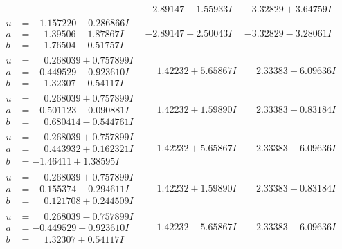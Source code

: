 \documentclass[1p]{elsarticle_modified}
\theoremstyle{definition}
\begin{document}
$$\begin{array}{c|c|c}
 & -2.89147 - 1.55933 I & -3.32829 + 3.64759 I \\ \hline\begin{aligned}
u &= -1.157220 - 0.286866 I \\
a &= \phantom{-}1.39506 - 1.87867 I \\
b &= \phantom{-}1.76504 - 0.51757 I\end{aligned}
 & -2.89147 + 2.50043 I & -3.32829 - 3.28061 I \\ \hline\begin{aligned}
u &= \phantom{-}0.268039 + 0.757899 I \\
a &= -0.449529 - 0.923610 I \\
b &= \phantom{-}1.32307 - 0.54117 I\end{aligned}
 & \phantom{-}1.42232 + 5.65867 I & \phantom{-}2.33383 - 6.09636 I \\ \hline\begin{aligned}
u &= \phantom{-}0.268039 + 0.757899 I \\
a &= -0.501123 + 0.090881 I \\
b &= \phantom{-}0.680414 - 0.544761 I\end{aligned}
 & \phantom{-}1.42232 + 1.59890 I & \phantom{-}2.33383 + 0.83184 I \\ \hline\begin{aligned}
u &= \phantom{-}0.268039 + 0.757899 I \\
a &= \phantom{-}0.443932 + 0.162321 I \\
b &= -1.46411 + 1.38595 I\end{aligned}
 & \phantom{-}1.42232 + 5.65867 I & \phantom{-}2.33383 - 6.09636 I \\ \hline\begin{aligned}
u &= \phantom{-}0.268039 + 0.757899 I \\
a &= -0.155374 + 0.294611 I \\
b &= \phantom{-}0.121708 + 0.244509 I\end{aligned}
 & \phantom{-}1.42232 + 1.59890 I & \phantom{-}2.33383 + 0.83184 I \\ \hline\begin{aligned}
u &= \phantom{-}0.268039 - 0.757899 I \\
a &= -0.449529 + 0.923610 I \\
b &= \phantom{-}1.32307 + 0.54117 I\end{aligned}
 & \phantom{-}1.42232 - 5.65867 I & \phantom{-}2.33383 + 6.09636 I \\ \hline\begin{aligned}

\end{aligned}
\end{array}$$
\end{document}
